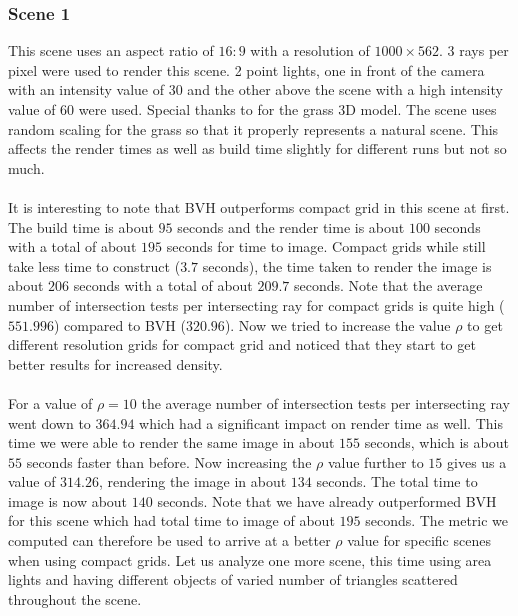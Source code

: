 \documentclass[11pt,a4paper]{article}
\begin{document}
\subsubsection{Scene 1}
This scene uses an aspect ratio of $16:9$ with a resolution of $1000 \times 562$. 3 rays per pixel were used to render this scene. 2 point lights, one in front of the camera with an intensity value of $30$ and the other above the scene with a high intensity value of $60$ were used. Special thanks to \cite{grass} for the grass 3D model. The scene uses random scaling for the grass so that it properly represents a natural scene. This affects the render times as well as build time slightly for different runs but not so much.
\\~\\
It is interesting to note that BVH outperforms compact grid in this scene at first. The build time is about $95$ seconds and the render time is about $100$ seconds with a total of about $195$ seconds for time to image. Compact grids while still take less time to construct ($3.7$ seconds), the time taken to render the image is about $206$ seconds with a total of about $209.7$ seconds. Note that the average number of intersection tests per intersecting ray for compact grids is quite high ($551.996$) compared to BVH ($320.96$). Now we tried to increase the value $\rho$ to get different resolution grids for compact grid and noticed that they start to get better results for increased density. 
\\~\\
For a value of $\rho=10$ the average number of intersection tests per intersecting ray went down to $364.94$ which had a significant impact on render time as well. This time we were able to render the same image in about $155$ seconds, which is about $55$ seconds faster than before. Now increasing the $\rho$ value further to $15$ gives us a value of $314.26$, rendering the image in about $134$ seconds. The total time to image is now about $140$ seconds. Note that we have already outperformed BVH for this scene which had total time to image of about $195$ seconds. The metric we computed can therefore be used to arrive at a better $\rho$ value for specific scenes when using compact grids. Let us analyze one more scene, this time using area lights and having different objects of varied number of triangles scattered throughout the scene.
\end{document}
